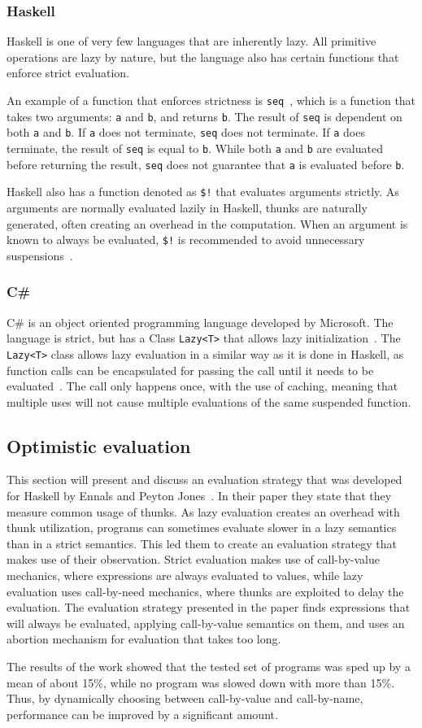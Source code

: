 \subsubsection{Haskell}
Haskell is one of very few languages that are inherently lazy. All primitive
operations are lazy by nature, but the language also has certain functions that
enforce strict evaluation.

An example of a function that enforces strictness is
\texttt{seq}~\cite{seqHaske29:online}, which is a function that takes two
arguments: \texttt{a} and \texttt{b}, and returns \texttt{b}. The
result of \texttt{seq} is dependent on both \texttt{a} and \texttt{b}. If
\texttt{a} does not terminate, \texttt{seq} does not terminate. If \texttt{a}
does terminate, the result of \texttt{seq} is equal to \texttt{b}. While both
\texttt{a} and \texttt{b} are evaluated before returning the result,
\texttt{seq} does not guarantee that \texttt{a} is evaluated before \texttt{b}.

Haskell also has a function denoted as \texttt{\$!} that evaluates arguments strictly.
As arguments are normally evaluated lazily in Haskell, thunks are naturally
generated, often creating an overhead in the computation. When an argument is
known to always be evaluated, \texttt{\$!} is recommended to avoid unnecessary
suspensions~\cite{Performa16:online}.

\subsubsection{C\#}
C\# is an object oriented programming language developed by Microsoft. The
language is strict, but has a Class \texttt{Lazy<T>} that allows lazy
initialization~\cite{LazyTCla1:online}. The \texttt{Lazy<T>} class allows
lazy evaluation in a similar way as it is done in Haskell, as
function calls can be encapsulated for passing the call until it needs to be
evaluated~\cite{csharp}. The call only happens once, with the use of caching,
meaning that multiple uses will not cause multiple evaluations of the same
suspended function.


\subsection{Optimistic evaluation}

This section will present and discuss an evaluation strategy that was developed
for Haskell by Ennals and Peyton Jones~\cite{Ennals:2003:OEA:944746.944731}.
In their paper they state that they measure common usage of thunks. As lazy
evaluation creates an overhead with thunk utilization, programs can sometimes
evaluate slower in a lazy semantics than in a strict semantics. This led
them to create an evaluation strategy that makes use of their observation.
Strict evaluation makes use of call-by-value mechanics, where expressions are
always evaluated to values, while lazy evaluation uses call-by-need mechanics,
where thunks are exploited to delay the evaluation. The evaluation strategy
presented in the paper finds expressions that will always be evaluated, applying
call-by-value semantics on them, and uses an abortion mechanism for evaluation
that takes too long.

The results of the work showed that the tested set of programs was sped up by
a mean of about 15\%, while no program was slowed down with more than 15\%.
Thus, by dynamically choosing between call-by-value and call-by-name,
performance can be improved by a significant amount.
